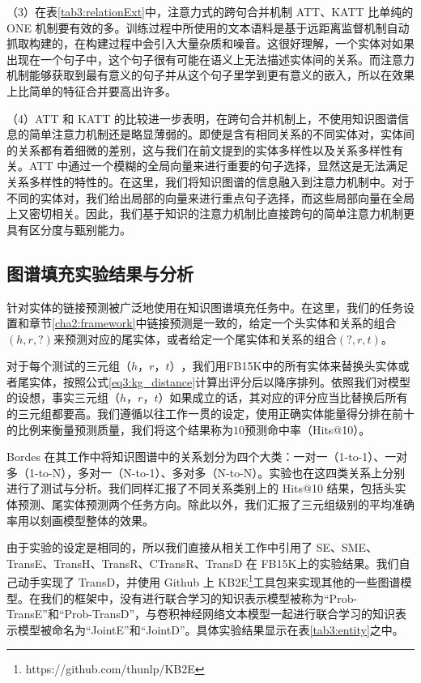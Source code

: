 （3）在表\ref{tab3:relationExt}中，注意力式的跨句合并机制 ATT、KATT 比单纯的 ONE 机制要有效的多。训练过程中所使用的文本语料是基于远距离监督机制自动抓取构建的，在构建过程中会引入大量杂质和噪音。这很好理解，一个实体对如果出现在一个句子中，这个句子很有可能在语义上无法描述实体间的关系。而注意力机制能够获取到最有意义的句子并从这个句子里学到更有意义的嵌入，所以在效果上比简单的特征合并要高出许多。


（4）ATT 和 KATT 的比较进一步表明，在跨句合并机制上，不使用知识图谱信息的简单注意力机制还是略显薄弱的。即使是含有相同关系的不同实体对，实体间的关系都有着细微的差别，这与我们在前文提到的实体多样性以及关系多样性有关。ATT 中通过一个模糊的全局向量来进行重要的句子选择，显然这是无法满足关系多样性的特性的。在这里，我们将知识图谱的信息融入到注意力机制中。对于不同的实体对，我们给出局部的向量来进行重点句子选择，而这些局部向量在全局上又密切相关。因此，我们基于知识的注意力机制比直接跨句的简单注意力机制更具有区分度与甄别能力。

\subsection{图谱填充实验结果与分析}

针对实体的链接预测被广泛地使用在知识图谱填充任务中\cite{bordes2013translating,wang2014transh,lin2015learning}。在这里，我们的任务设置和章节\ref{cha2:framework}中链接预测是一致的，给定一个头实体和关系的组合$(h, r, ?)$来预测对应的尾实体，或者给定一个尾实体和关系的组合$(?, r ,t)$。

对于每个测试的三元组$（h，r，t）$，我们用FB15K中的所有实体来替换头实体或者尾实体，按照公式\ref{eq3:kg_distance}计算出评分后以降序排列。依照我们对模型的设想，事实三元组$（h，r，t）$如果成立的话，其对应的评分应当比替换后所有的三元组都要高。我们遵循以往工作一贯的设定，使用正确实体能量得分排在前十的比例来衡量预测质量，我们将这个结果称为$10$预测命中率（Hits@10）。

Bordes\cite{bordes2013translating} 在其工作中将知识图谱中的关系划分为四个大类：一对一（1-to-1）、一对多（1-to-N），多对一（N-to-1）、多对多（N-to-N）。实验也在这四类关系上分别进行了测试与分析。我们同样汇报了不同关系类别上的 Hits@10 结果，包括头实体预测、尾实体预测两个任务方向。除此以外，我们汇报了三元组级别的平均准确率用以刻画模型整体的效果。

由于实验的设定是相同的，所以我们直接从相关工作\cite{bordes2011learning,bordes2012joint,bordes2013translating,wang2014transh,lin2015learning,ji2015knowledge}中引用了 SE、SME、TransE、TransH、TransR、CTransR、TransD 在 FB15K上的实验结果。我们自己动手实现了 TransD，并使用 Github 上 KB2E\footnote{https://github.com/thunlp/KB2E}工具包来实现其他的一些图谱模型。在我们的框架中，没有进行联合学习的知识表示模型被称为``Prob-TransE''和``Prob-TransD''，与卷积神经网络文本模型一起进行联合学习的知识表示模型被命名为``JointE''和``JointD''。具体实验结果显示在表\ref{tab3:entity}之中。

